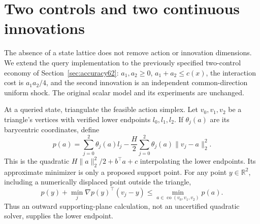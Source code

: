 \section{Two controls and two continuous innovations}\label{sec:vector67}
The absence of a state lattice does not remove action or innovation dimensions. We extend the query implementation to the previously specified two-control economy of Section~\ref{sec:accuracy62}: $a_1,a_2\ge0$, $a_1+a_2\le c(x)$, the interaction cost is $a_1a_2/4$, and the second innovation is an independent common-direction uniform shock. The original scalar model and its experiments are unchanged.

At a queried state, triangulate the feasible action simplex. Let $v_0,v_1,v_2$ be a triangle's vertices with verified lower endpoints $l_0,l_1,l_2$. If $\theta_j(a)$ are its barycentric coordinates, define
\begin{equation}\label{eq:triangle67}
 p(a)=\sum_{j=0}^2\theta_j(a)l_j
       -\frac H2\sum_{j=0}^2\theta_j(a)\|v_j-a\|_2^2.
\end{equation}
This is the quadratic $H\|a\|_2^2/2+b^\top a+c$ interpolating the lower endpoints. Its approximate minimizer is only a proposed support point. For any point $y\in\mathbb R^2$, including a numerically displaced point outside the triangle,
\begin{equation}\label{eq:dual-triangle67}
 p(y)+\min_j\nabla p(y)^\top(v_j-y)
                    \le \min_{a\in\operatorname{co}(v_0,v_1,v_2)}p(a).
\end{equation}
Thus an outward supporting-plane calculation, not an uncertified quadratic solver, supplies the lower endpoint.

